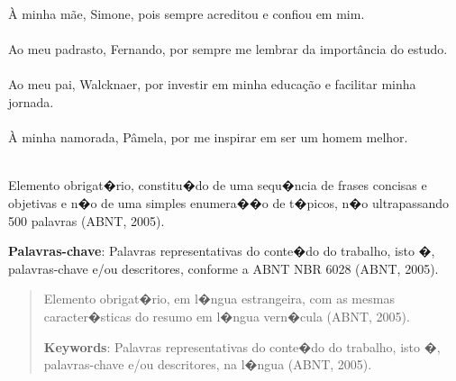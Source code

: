\hspace{5mm}
\begin{flushright}
  \begin{minipage}[t]{8cm}
    
    \`A minha m\~ae, Simone, pois sempre acreditou e confiou em mim. \\\\
    Ao meu padrasto, Fernando, por sempre me lembrar da import\^ancia do estudo. \\\\
    Ao meu pai, Walcknaer, por investir em minha educa\c{c}\~ao e facilitar minha jornada. \\\\
    \`A minha namorada, P\^amela, por me inspirar em ser um homem melhor.\\\\
  \end{minipage}
\end{flushright}
\begin{resumo}

Elemento obrigat�rio, constitu�do de uma sequ�ncia de frases concisas e objetivas e n�o de uma simples enumera��o de t�picos, n�o ultrapassando 500 palavras (ABNT, 2005).

{\hspace{-8mm} \bf{Palavras-chave}}: Palavras representativas do conte�do do trabalho, isto �, palavras-chave e/ou descritores, conforme a ABNT NBR 6028 (ABNT, 2005).

\end{resumo}

\begin{abstract}

Elemento obrigat�rio, em l�ngua estrangeira, com as mesmas caracter�sticas do resumo em l�ngua vern�cula (ABNT, 2005).

{\hspace{-8mm} \bf{Keywords}}: Palavras representativas do conte�do do trabalho, isto �, palavras-chave e/ou descritores, na l�ngua (ABNT, 2005).

\end{abstract}

